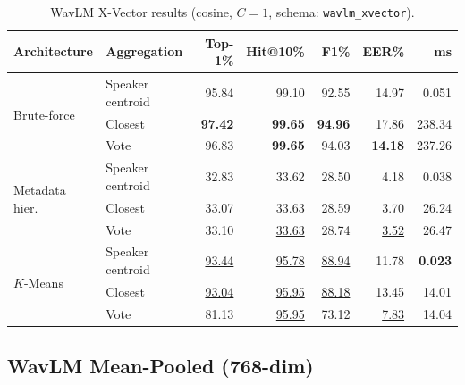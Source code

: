 \documentclass[12pt, a4paper]{article}
\newcommand{\code}[1]{\texttt{#1}}
\begin{document}
\begin{table}[H]
\centering
\caption{WavLM X-Vector results (cosine, $C{=}1$, schema: \code{wavlm\_xvector}).}
\label{tab:results_wavlm_xvec}
\setlength{\tabcolsep}{4pt}
\begin{tabular}{llrrrrr}
\toprule
\textbf{Architecture} & \textbf{Aggregation} &
\textbf{Top-1\%} & \textbf{Hit@10\%} &
\textbf{F1\%} & \textbf{EER\%} & \textbf{ms} \\
\midrule
\multirow{3}{*}{Brute-force}
  & Speaker centroid & 95.84 & 99.10 & 92.55 & 14.97 & 0.051 \\
  & Closest          & \textbf{97.42} & \textbf{99.65} & \textbf{94.96} & 17.86 & 238.34 \\
  & Vote             & 96.83 & \textbf{99.65} & 94.03 & \textbf{14.18} & 237.26 \\
\midrule
\multirow{3}{*}{Metadata hier.}
  & Speaker centroid & 32.83 & 33.62 & 28.50 & 4.18 & 0.038 \\
  & Closest          & 33.07 & 33.63 & 28.59 & 3.70 & 26.24 \\
  & Vote             & 33.10 & \underline{33.63} & 28.74 & \underline{3.52} & 26.47 \\
\midrule
\multirow{3}{*}{$K$-Means}
  & Speaker centroid & \underline{93.44} & \underline{95.78} & \underline{88.94} & 11.78 & \textbf{0.023} \\
  & Closest          & \underline{93.04} & \underline{95.95} & \underline{88.18} & 13.45 & 14.01 \\
  & Vote             & 81.13 & \underline{95.95} & 73.12 & \underline{7.83} & 14.04 \\
\bottomrule
\end{tabular}
\end{table}

\subsection{WavLM Mean-Pooled (768-dim)}
\label{sec:results_wavlm}
\end{document}
